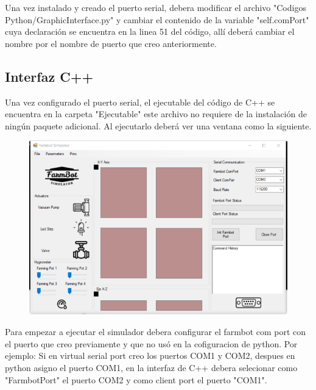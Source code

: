 \documentclass[letterpaper,12pt]{article}
\begin{document}
	Una vez instalado y creado el puerto serial, debera modificar el archivo "Codigos Python/GraphicInterface.py" y cambiar el contenido de la variable "self.comPort" cuya declaración se encuentra en la linea 51 del código, allí deberá cambiar el nombre por el nombre de puerto que creo anteriormente.
	\subsection{Interfaz C++}
	\label{subsec:C++}
	Una vez configurado el puerto serial, el ejecutable del código de C++ se encuentra en la carpeta "Ejecutable" este archivo no requiere de la instalación de ningún paquete adicional. Al ejecutarlo deberá ver una ventana como la siguiente.
	\begin{figure}[H]
		\centering
		\includegraphics[width=0.7\linewidth]{images/interfazC++}

		\label{fig:interfazc}
	\end{figure}
	Para empezar a ejecutar el simulador debera configurar el farmbot com port con el puerto que creo previamente y que no usó en la cofiguracion de python. Por ejemplo: Si en virtual serial port creo los puertos COM1 y COM2, despues en python asigno el puerto COM1, en la interfaz de C++ debera selecionar como "FarmbotPort" el puerto COM2 y como client port el puerto "COM1".
	
	
\end{document}
